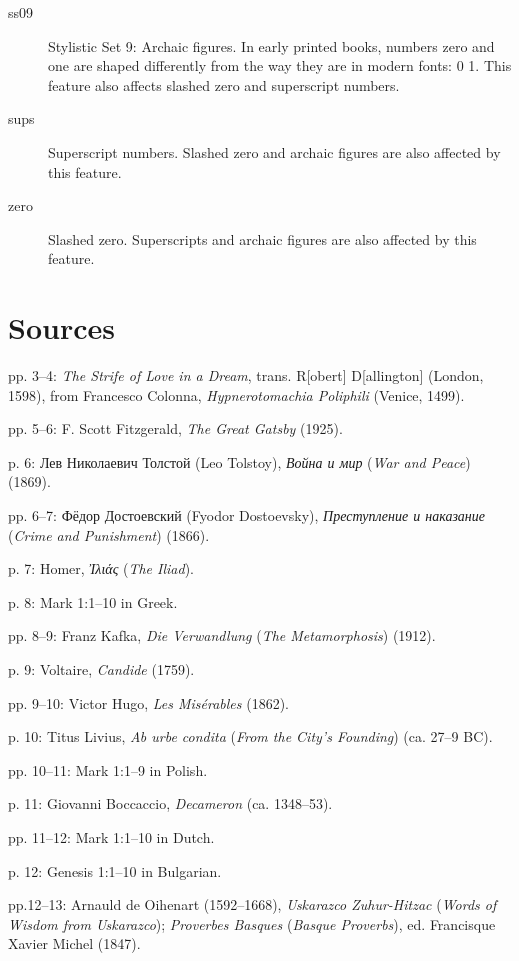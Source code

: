 \documentclass[12pt]{book}
\begin{document}
\begin{description}
\item[ss09] Stylistic Set 9: Archaic figures. In early printed books,
  numbers zero and one are shaped differently from the way they are in
  modern fonts: {0 1}. This feature
  also affects slashed zero and superscript numbers.

\item[sups] Superscript numbers. Slashed zero and archaic figures are also affected by this feature.

\item[zero] Slashed zero. Superscripts and archaic figures are also affected by this feature.

\end{description}

\section*{Sources}
\begin{hangparas}{.25in}{1}
pp. 3–4: \textit{The Strife of Love in a Dream}, trans. R[obert]
D[allington] (London, 1598), from Francesco Colonna,
\textit{Hypnerotomachia Poliphili} (Venice, 1499).

pp. 5–6: F. Scott Fitzgerald, \textit{The Great Gatsby} (1925).

p. 6: Лев Николаевич Толстой (Leo Tolstoy), \textit{Война и мир} (\textit{War and Peace}) (1869).

pp. 6–7:  Фёдор Достоевский (Fyodor Dostoevsky), \textit{Преступление и наказание} (\textit{Crime and Punishment}) (1866).

p. 7: Homer, \textit{Ἰλιάς} (\textit{The Iliad}).

p. 8: Mark 1:1–10 in Greek.

pp. 8–9: Franz Kafka, \textit{Die Verwandlung} (\textit{The Metamorphosis}) (1912).

p. 9: Voltaire, \textit{Candide} (1759).

pp. 9–10: Victor Hugo, \textit{Les Misérables} (1862).

p. 10: Titus Livius, \textit{Ab urbe condita} (\textit{From the City's
  Founding}) (ca. 27–9 BC).

pp. 10–11: Mark 1:1–9 in Polish.

p. 11: Giovanni Boccaccio, \textit{Decameron} (ca. 1348–53).

pp. 11–12: Mark 1:1–10 in Dutch.

p. 12: Genesis 1:1–10 in Bulgarian.

pp.12–13: Arnauld de Oihenart (1592–1668), \textit{Uskarazco Zuhur-Hitzac}
(\textit{Words of Wisdom from Uskarazco}); \textit{Proverbes Basques}
(\textit{Basque Proverbs}), ed. Francisque Xavier Michel (1847).
\end{hangparas}
\end{document}
